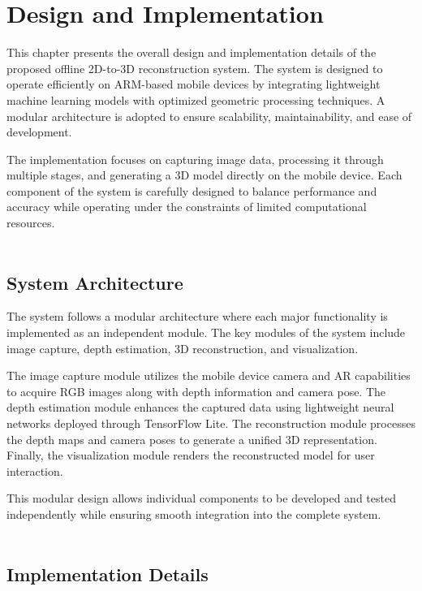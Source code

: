 \chapter{Design and Implementation}

This chapter presents the overall design and implementation details of the proposed offline 2D-to-3D reconstruction system. The system is designed to operate efficiently on ARM-based mobile devices by integrating lightweight machine learning models with optimized geometric processing techniques. A modular architecture is adopted to ensure scalability, maintainability, and ease of development.

The implementation focuses on capturing image data, processing it through multiple stages, and generating a 3D model directly on the mobile device. Each component of the system is carefully designed to balance performance and accuracy while operating under the constraints of limited computational resources. \\ \\

\section{System Architecture}

The system follows a modular architecture where each major functionality is implemented as an independent module. The key modules of the system include image capture, depth estimation, 3D reconstruction, and visualization.

The image capture module utilizes the mobile device camera and AR capabilities to acquire RGB images along with depth information and camera pose. The depth estimation module enhances the captured data using lightweight neural networks deployed through TensorFlow Lite. The reconstruction module processes the depth maps and camera poses to generate a unified 3D representation. Finally, the visualization module renders the reconstructed model for user interaction.

This modular design allows individual components to be developed and tested independently while ensuring smooth integration into the complete system. \\ \\

\section{Implementation Details}

